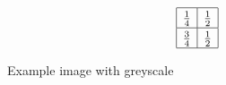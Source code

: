 \documentclass{article}
\begin{document}
\begin{figure}[ht]
$$\renewcommand\arraystretch{1.3}\begin{array}{|c|c|}
 \hline
 \frac{1}{4} & \frac{1}{2} \\
 \hline
 \frac{3}{4} & \frac{1}{2} \\
 \hline
\end{array}$$
\caption{Example image with greyscale}
\label{fig:img}
\end{figure}
\newpage
\nocite{*}


\end{document}
